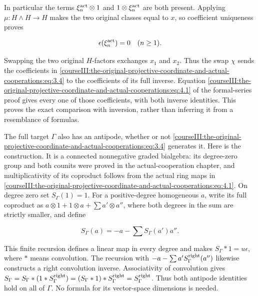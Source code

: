 In particular the terms \(\xi_n^{\rm act}\otimes1\) and \(1\otimes\xi_n^{\rm act}\) are both present. Applying \(\mu:H\wedge H\to H\) makes the two original classes equal to \(x\), so coefficient uniqueness proves

\begin{equation}
\epsilon(\xi_n^{\rm act})=0\quad(n\geq1).
 \label{courseIII:the-original-projective-coordinate-and-actual-cooperations:eq:4.4}
\end{equation}

Swapping the two original \(H\)-factors exchanges \(x_1\) and \(x_2\). Thus the swap \(\chi\) sends the coefficients in \eqref{courseIII:the-original-projective-coordinate-and-actual-cooperations:eq:3.4} to the coefficients of its full inverse. Equation \eqref{courseIII:the-original-projective-coordinate-and-actual-cooperations:eq:4.1} of the formal-series proof gives every one of those coefficients, with both inverse identities. This proves the exact comparison with inversion, rather than inferring it from a resemblance of formulas.

The full target \(\Gamma\) also has an antipode, whether or not \eqref{courseIII:the-original-projective-coordinate-and-actual-cooperations:eq:3.4} generates it. Here is the construction. It is a connected nonnegative graded bialgebra: its degree-zero group and both counits were proved in the actual-cooperation chapter, and multiplicativity of its coproduct follows from the actual ring maps in \eqref{courseIII:the-original-projective-coordinate-and-actual-cooperations:eq:4.1}. On degree zero set \(S_\Gamma(1)=1\). For a positive-degree homogeneous \(a\), write its full coproduct as \(a\otimes1+1\otimes a+\sum a'\otimes a''\), where both degrees in the sum are strictly smaller, and define

\begin{equation}
S_\Gamma(a)=-a-\sum S_\Gamma(a')a''.
 \label{courseIII:the-original-projective-coordinate-and-actual-cooperations:eq:4.4a}
\end{equation}

This finite recursion defines a linear map in every degree and makes \(S_\Gamma*1=u\epsilon\), where \(*\) means convolution. The recursion with \(-a-\sum a'S_\Gamma^{\rm right}(a'')\) likewise constructs a right convolution inverse. Associativity of convolution gives
\(S_\Gamma=S_\Gamma*(1*S_\Gamma^{\rm right})=(S_\Gamma*1)*S_\Gamma^{\rm right}=S_\Gamma^{\rm right}\).
Thus both antipode identities hold on all of \(\Gamma\). No formula for its vector-space dimensions is needed.

